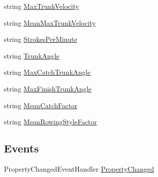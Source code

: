 \begin{DoxyCompactItemize}
\item 
string \hyperlink{class_rowing_monitor_1_1_view_model_1_1_rowing_meta_data_debug_view_model_a9b29fed094b5664914c1399758bc7728}{Max\+Trunk\+Velocity}
\item 
string \hyperlink{class_rowing_monitor_1_1_view_model_1_1_rowing_meta_data_debug_view_model_acc977e2c789b254b73a4ecbe0dc49577}{Mean\+Max\+Trunk\+Velocity}
\item 
string \hyperlink{class_rowing_monitor_1_1_view_model_1_1_rowing_meta_data_debug_view_model_a344eb969d50db850f7e8a2ffbff96a49}{Strokes\+Per\+Minute}
\item 
string \hyperlink{class_rowing_monitor_1_1_view_model_1_1_rowing_meta_data_debug_view_model_a42a2354e28f13dcf7ff4db58093d5604}{Trunk\+Angle}
\item 
string \hyperlink{class_rowing_monitor_1_1_view_model_1_1_rowing_meta_data_debug_view_model_a25b04c304c6c3a5977bd2520ede1e7c3}{Max\+Catch\+Trunk\+Angle}
\item 
string \hyperlink{class_rowing_monitor_1_1_view_model_1_1_rowing_meta_data_debug_view_model_a2fe2f846ba972b3bfa62f08d8f7e054e}{Max\+Finish\+Trunk\+Angle}
\item 
string \hyperlink{class_rowing_monitor_1_1_view_model_1_1_rowing_meta_data_debug_view_model_ab2e80c441072f488f247942c99fa70b4}{Mean\+Catch\+Factor}
\item 
string \hyperlink{class_rowing_monitor_1_1_view_model_1_1_rowing_meta_data_debug_view_model_a282c3663e2a5727a308e6ac8667158c8}{Mean\+Rowing\+Style\+Factor}
\end{DoxyCompactItemize}
\subsection*{Events}
\begin{DoxyCompactItemize}
\item 
Property\+Changed\+Event\+Handler \hyperlink{class_rowing_monitor_1_1_view_model_1_1_rowing_meta_data_debug_view_model_a330fed4ef7c22c9c2f114759e07957cb}{Property\+Changed}
\end{DoxyCompactItemize}


